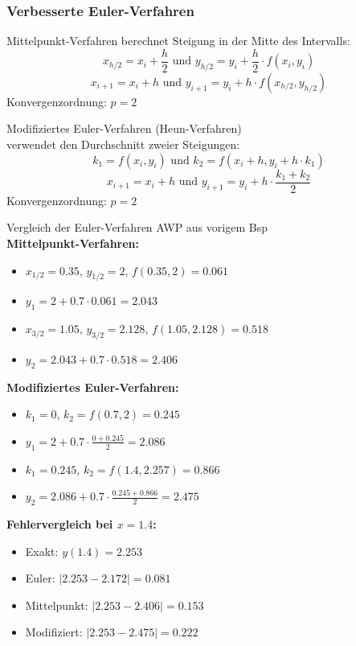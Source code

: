 \subsubsection{Verbesserte Euler-Verfahren}

\begin{theorem}{Mittelpunkt-Verfahren}
berechnet Steigung in der Mitte des Intervalls:
$$x_{h/2} = x_i + \frac{h}{2} \text{ und } y_{h/2} = y_i + \frac{h}{2} \cdot f(x_i, y_i)$$
$$x_{i+1} = x_i + h \text{ und } y_{i+1} = y_i + h \cdot f(x_{h/2}, y_{h/2})$$
\small
Konvergenzordnung: $p = 2$
\end{theorem}

\begin{corollary}{Modifiziertes Euler-Verfahren (Heun-Verfahren)}\\
verwendet den Durchschnitt zweier Steigungen:
$$k_1 = f(x_i, y_i) \text{ und } k_2 = f(x_i + h, y_i + h \cdot k_1)$$
$$x_{i+1} = x_i + h \text{ und } y_{i+1} = y_i + h \cdot \frac{k_1 + k_2}{2}$$
\small
Konvergenzordnung: $p = 2$
\end{corollary}

\begin{example2}{Vergleich der Euler-Verfahren} AWP aus vorigem Bsp\\
\textbf{Mittelpunkt-Verfahren:}
\begin{itemize}
    \item $x_{1/2} = 0.35$, $y_{1/2} = 2$, $f(0.35, 2) = 0.061$
    \item $y_1 = 2 + 0.7 \cdot 0.061 = 2.043$
    \item $x_{3/2} = 1.05$, $y_{3/2} = 2.128$, $f(1.05, 2.128) = 0.518$
    \item $y_2 = 2.043 + 0.7 \cdot 0.518 = 2.406$
\end{itemize}
\vspace{2mm}
\textbf{Modifiziertes Euler-Verfahren:}
\begin{itemize}
    \item $k_1 = 0$, $k_2 = f(0.7, 2) = 0.245$
    \item $y_1 = 2 + 0.7 \cdot \frac{0 + 0.245}{2} = 2.086$
    \item $k_1 = 0.245$, $k_2 = f(1.4, 2.257) = 0.866$
    \item $y_2 = 2.086 + 0.7 \cdot \frac{0.245 + 0.866}{2} = 2.475$
\end{itemize}
\vspace{2mm}
\textbf{Fehlervergleich bei $x = 1.4$:}
\begin{itemize}
    \item Exakt: $y(1.4) = 2.253$
    \item Euler: $|2.253 - 2.172| = 0.081$
    \item Mittelpunkt: $|2.253 - 2.406| = 0.153$
    \item Modifiziert: $|2.253 - 2.475| = 0.222$
\end{itemize}
\end{example2}

